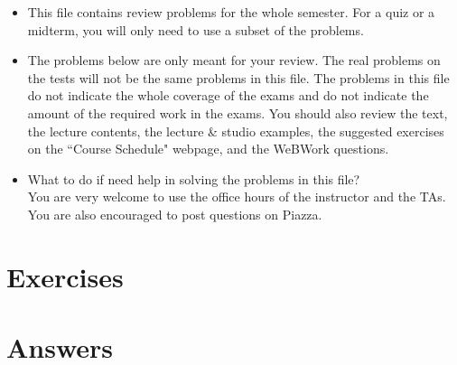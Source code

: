 \documentclass[12pt]{article}
\begin{document}
\begin{itemize}
	\item This file contains review problems for the whole semester. For a quiz or a midterm, you will only need to use a subset of the problems.

\def\specifyproblems{
	\begin{itemize}
	\item
{\bf Review Problems for Midterm 1:} \PROBONE{}.
	\item
{\bf Review Problems for Midterm 2:} \PROBTWO{}.
	\item
{\bf \hl{Review Problems for the Final:}} \colorbox{yellow}{\PROBFINAL{}.}
	\end{itemize}
}

	\item
The problems below are only meant for your review. 
The real problems on the tests will not be the same problems in this file.
The problems in this file 
do not indicate the whole coverage of the exams
and do not indicate the amount of the required work in the exams. 
You should also review the text, the lecture contents,
the lecture \& studio examples, 
the suggested exercises on the ``Course Schedule" webpage,
and the WeBWork questions. \bf
	\item What to do if need help in solving the problems in this file? \\
\rm
You are very welcome to use the office hours of the instructor and the TAs. You are also encouraged to post questions on Piazza.


% 

\end{itemize}



 \section*{Exercises}

\begin{enumerate}




\end{enumerate}

\newpage

\section*{Answers}

\begin{enumerate}



\end{enumerate}

 
\end{document}
